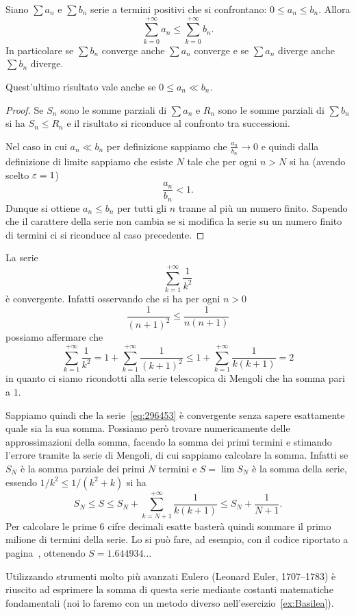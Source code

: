 \begin{theorem}
\mymark{**}
Siano $\sum a_n$ e $\sum b_n$ serie a
termini positivi che si confrontano: $0\le a_n\le b_n$.
Allora
\[
  \sum_{k=0}^{+\infty} a_n \le \sum_{k=0}^{+\infty} b_n.
\]
In particolare se $\sum b_n$ converge anche $\sum a_n$ converge
e se $\sum a_n$ diverge anche $\sum b_n$ diverge.

Quest'ultimo risultato vale anche se $0 \le a_n \ll b_n$.
\end{theorem}
%
\begin{proof}
\mymark{*}
Se $S_n$ sono le somme parziali di $\sum a_n$ e $R_n$ sono le somme
parziali di $\sum b_n$ si ha $S_n \le R_n$ e il risultato
si riconduce al confronto tra successioni.

Nel caso in cui $a_n \ll b_n$ per definizione sappiamo che $\frac{a_n}{b_n}\to 0$
e quindi dalla definizione di limite sappiamo che
esiste $N$ tale che per ogni $n>N$ si ha (avendo scelto $\varepsilon=1$)
\[
  \frac{a_n}{b_n} < 1.
\]
Dunque si ottiene $a_n \le b_n$ per tutti gli $n$ tranne al più un numero
finito. Sapendo che il carattere della serie non cambia se si modifica
la serie su un numero finito di termini ci si riconduce al caso precedente.
\end{proof}

\begin{example}\label{ex:52573}
\mymark{***}
La serie
\begin{equation}\label{eq:296453}
 \sum_{k=1}^{+\infty} \frac{1}{k^2}
\end{equation}
è convergente.
Infatti osservando che si ha per ogni $n>0$
\[
  \frac{1}{(n+1)^2} \le \frac{1}{n(n+1)}
\]
possiamo affermare che
\[
  \sum_{k=1}^{+\infty} \frac{1}{k^2}
  = 1 + \sum_{k=1}^{+\infty} \frac{1}{(k+1)^2}
  \le 1+ \sum_{k=1}^{+\infty} \frac{1}{k(k+1)}
  = 2
\]
in quanto ci siamo ricondotti alla
serie telescopica di Mengoli che ha somma pari a $1$.

Sappiamo quindi che la serie~\eqref{eq:296453} è convergente
senza sapere esattamente quale sia la sua somma.
Possiamo però trovare numericamente delle approssimazioni
della somma, facendo la somma dei primi termini
e stimando l'errore tramite la serie di Mengoli,
di cui sappiamo calcolare la somma.
Infatti se $S_N$ è la somma parziale dei primi
$N$ termini e $S = \lim S_N$ è la somma della serie,
essendo $1/k^2 \le 1/(k^2+k)$ si ha
\[
S_N
\le S
\le S_N + \sum_{k=N+1}^{+\infty} \frac{1}{k(k+1)}
\le S_N + \frac{1}{N+1}.
\]
Per calcolare le prime 6 cifre decimali esatte basterà
quindi sommare il primo milione di termini della serie.
Lo si può fare, ad esempio, con il codice riportato
a pagina~\pageref{code:series}, ottenendo $S=1.644934\ldots$

Utilizzando strumenti molto più avanzati
Eulero 
(Leonard Euler, 1707--1783) è
riuscito ad esprimere la somma di questa serie mediante costanti matematiche fondamentali
(noi lo faremo con un metodo diverso nell'esercizio~\ref{ex:Basilea}).
\end{example}

